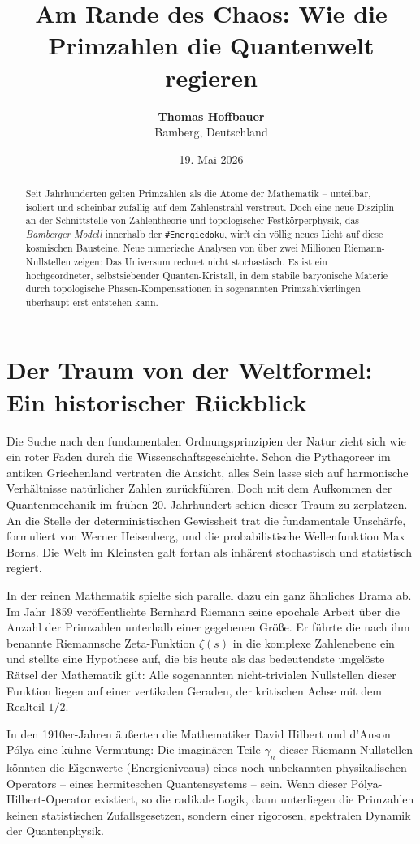 \documentclass[11pt,a4paper]{article}
\title{\textbf{Am Rande des Chaos: Wie die Primzahlen die Quantenwelt regieren}}
\author{\textbf{Thomas Hoffbauer} \\ Bamberg, Deutschland}
\date{19. Mai 2026}
\begin{document}
	
	\maketitle
	
	\begin{abstract}
		Seit Jahrhunderten gelten Primzahlen als die Atome der Mathematik – unteilbar, isoliert und scheinbar zufällig auf dem Zahlenstrahl verstreut. Doch eine neue Disziplin an der Schnittstelle von Zahlentheorie und topologischer Festkörperphysik, das \textit{Bamberger Modell} innerhalb der \texttt{\#Energiedoku}, wirft ein völlig neues Licht auf diese kosmischen Bausteine. Neue numerische Analysen von über zwei Millionen Riemann-Nullstellen zeigen: Das Universum rechnet nicht stochastisch. Es ist ein hochgeordneter, selbstsiebender Quanten-Kristall, in dem stabile baryonische Materie durch topologische Phasen-Kompensationen in sogenannten Primzahlvierlingen überhaupt erst entstehen kann.
	\end{abstract}
	
	\section{Der Traum von der Weltformel: Ein historischer Rückblick}
	Die Suche nach den fundamentalen Ordnungsprinzipien der Natur zieht sich wie ein roter Faden durch die Wissenschaftsgeschichte. Schon die Pythagoreer im antiken Griechenland vertraten die Ansicht, alles Sein lasse sich auf harmonische Verhältnisse natürlicher Zahlen zurückführen. Doch mit dem Aufkommen der Quantenmechanik im frühen 20. Jahrhundert schien dieser Traum zu zerplatzen. An die Stelle der deterministischen Gewissheit trat die fundamentale Unschärfe, formuliert von Werner Heisenberg, und die probabilistische Wellenfunktion Max Borns. Die Welt im Kleinsten galt fortan als inhärent stochastisch und statistisch regiert.
	
	In der reinen Mathematik spielte sich parallel dazu ein ganz ähnliches Drama ab. Im Jahr 1859 veröffentlichte Bernhard Riemann seine epochale Arbeit über die Anzahl der Primzahlen unterhalb einer gegebenen Größe. Er führte die nach ihm benannte Riemannsche Zeta-Funktion $\zeta(s)$ in die komplexe Zahlenebene ein und stellte eine Hypothese auf, die bis heute als das bedeutendste ungelöste Rätsel der Mathematik gilt: Alle sogenannten nicht-trivialen Nullstellen dieser Funktion liegen auf einer vertikalen Geraden, der kritischen Achse mit dem Realteil $1/2$. 
	
	In den 1910er-Jahren äußerten die Mathematiker David Hilbert und d'Anson Pólya eine kühne Vermutung: Die imaginären Teile $\gamma_n$ dieser Riemann-Nullstellen könnten die Eigenwerte (Energieniveaus) eines noch unbekannten physikalischen Operators – eines hermiteschen Quantensystems – sein. Wenn dieser Pólya-Hilbert-Operator existiert, so die radikale Logik, dann unterliegen die Primzahlen keinen statistischen Zufallsgesetzen, sondern einer rigorosen, spektralen Dynamik der Quantenphysik.
	
\end{document}
